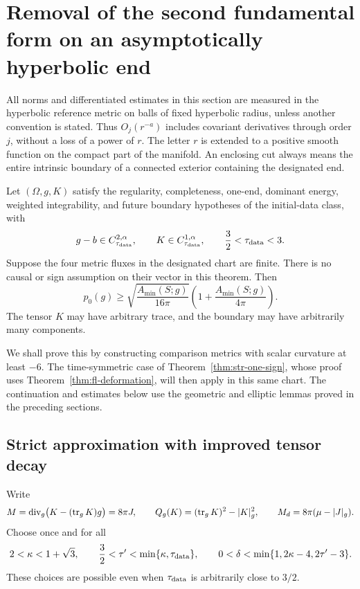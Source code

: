 \section[Hyperbolic deformation and the time component inequality]{Removal of the second fundamental form on an asymptotically hyperbolic end}
\label{sec:ah-deformation}

All norms and differentiated estimates in this section are measured in the
hyperbolic reference metric on balls of fixed hyperbolic radius, unless
another convention is stated.  Thus \(O_j(r^{-a})\) includes covariant
derivatives through order \(j\), without a loss of a power of \(r\).
The letter \(r\) is extended to a positive smooth function on the compact
part of the manifold.  An enclosing cut always means the entire intrinsic
boundary of a connected exterior containing the designated end.

\begin{theorem}\label{thm:ah-component}
Let \((\Omega,g,K)\) satisfy the regularity, completeness, one-end,
dominant energy, weighted integrability, and future boundary hypotheses
of the initial-data class, with
\[
 g-b\in C^{2,\alpha}_{\tau_{\rm data}},\qquad
 K\in C^{1,\alpha}_{\tau_{\rm data}},\qquad
 \frac32<\tau_{\rm data}<3 .
\]
Suppose the four metric fluxes in the designated chart are finite.
There is no causal or sign assumption on their vector in this theorem.
Then
\begin{equation}
 p_0(g)\ge
 \sqrt{\frac{A_{\min}(S;g)}{16\pi}}
 \left(1+\frac{A_{\min}(S;g)}{4\pi}\right).
 \label{eq:ah-component-bound}
\end{equation}
The tensor \(K\) may have arbitrary trace, and the boundary may have
arbitrarily many components.
\end{theorem}

We shall prove this by constructing comparison metrics with scalar
curvature at least \(-6\).  The time-symmetric case of
Theorem~\ref{thm:str-one-sign}, whose proof uses
Theorem~\ref{thm:fl-deformation}, will then apply in this same chart.
The continuation and estimates below use the geometric and elliptic
lemmas proved in the preceding sections.

\subsection{Strict approximation with improved tensor decay}
\label{subsec:ah-preparation}

Write
\[
 M= \operatorname{div}_g\bigl(K-(\operatorname{tr}_gK)g\bigr)=8\pi J,
 \qquad
 Q_g(K)=(\operatorname{tr}_gK)^2-|K|_g^2,
 \qquad
 M_d=8\pi(\mu-|J|_g).
\]
Choose once and for all
\begin{equation}\label{eq:ah-preparation-exponents}
 2<\kappa<1+\sqrt3,\qquad
 \frac32<\tau'<\min\{\kappa,\tau_{\rm data}\},\qquad
 0<\delta<\min\{1,2\kappa-4,2\tau'-3\}.
\end{equation}
These choices are possible even when \(\tau_{\rm data}\) is arbitrarily
close to \(3/2\).

